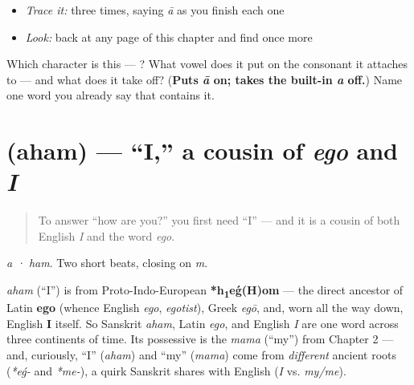 \begin{quote}
\end{quote}

\begin{itemize}
\raggedright
  \item \emph{Trace it:}  three times, saying \emph{ā} as you finish each one
  \item \emph{Look:} back at any page of this chapter and find  once more
\end{itemize}

\begin{tcolorbox}[breakable,colback=teal!4,colframe=teal!35!black,title={Before you move on}]
Which character is this — ? What vowel does it put on the consonant it attaches to — and what does it take off? (\textbf{Puts \emph{ā} on; takes the built-in \emph{a} off.}) Name one word you already say that contains it.
\end{tcolorbox}
\section[\texorpdfstring{\sk{अहम्} (aham)}{अहम् (aham)}]{ (aham) — \textquotedblleft{}I,\textquotedblright{} a cousin of \emph{ego} and \emph{I}}

\label{lesson:SA-C03-aham}



\begin{quote}
To answer \textquotedblleft{}how are you?\textquotedblright{} you first need \textquotedblleft{}I\textquotedblright{} — and it is a cousin of both English \emph{I} and the word \emph{ego}.
\end{quote}

\begin{sounds}
\emph{a · ham}. Two short beats, closing on \emph{m}.
\end{sounds}

\begin{cousinweb}
\emph{aham} (\textquotedblleft{}I\textquotedblright{}) is from Proto-Indo-European \textbf{*h\textsubscript{1}eǵ(H)om} — the direct ancestor of Latin \textbf{ego} (whence English \emph{ego}, \emph{egotist}), Greek \emph{egō}, and, worn all the way down, English \textbf{I} itself. So Sanskrit \emph{aham}, Latin \emph{ego}, and English \emph{I} are one word across three continents of time. Its possessive is the \emph{mama} (\textquotedblleft{}my\textquotedblright{}) from Chapter 2 — and, curiously, \textquotedblleft{}I\textquotedblright{} (\emph{aham}) and \textquotedblleft{}my\textquotedblright{} (\emph{mama}) come from \emph{different} ancient roots (\emph{*eǵ-} and \emph{*me-}), a quirk Sanskrit shares with English (\emph{I} vs. \emph{my/me}).
\end{cousinweb}

